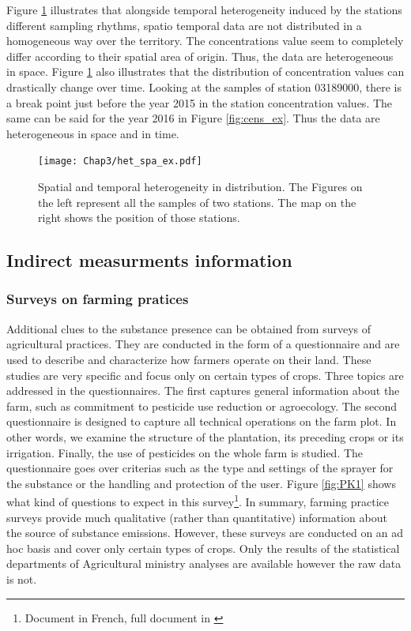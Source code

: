 Figure \ref{fig:het_spa_ex} illustrates that alongside temporal heterogeneity induced by the stations different sampling rhythms, spatio temporal data are not distributed in a homogeneous way over the territory. The concentrations value seem to completely differ according to their spatial area of origin. Thus, the data are heterogeneous in space. Figure \ref{fig:het_spa_ex} also illustrates that the distribution of concentration values can drastically change over time. Looking at the samples of station 03189000, there is a break point just before the year 2015 in the station concentration values. The same can be said for the year 2016 in Figure \ref{fig:cens_ex}. Thus the data are heterogeneous in space and in time.  

\begin{figure}[ht]
    \centering
    \texttt{[image: Chap3/het\_spa\_ex.pdf]}
    \caption{Spatial and temporal heterogeneity in distribution. The Figures on the left represent all the samples of two stations. The map on the right shows the position of those stations.}
    \label{fig:het_spa_ex}
\end{figure}

\subsection{Indirect measurments information}

\subsubsection{Surveys on farming pratices}

Additional clues to the substance presence can be obtained from surveys of agricultural practices. They are conducted in the form of a questionnaire and are used to describe and characterize how farmers operate on their land. These studies are very specific and focus only on certain types of crops. Three topics are addressed in the questionnaires. The first captures general information about the farm, such as commitment to pesticide use reduction or agroecology. The second questionnaire is designed to capture all technical operations on the farm plot. In other words, we examine the structure of the plantation, its preceding crops or its irrigation. Finally, the use of pesticides on the whole farm is studied. The questionnaire goes over criterias such as the type and settings of the sprayer for the substance or the handling and protection of the user.  
Figure \ref{fig:PK1} shows what kind of questions to expect in this survey\footnote{Document in French, full document in \cite{PK}}. In summary, farming practice surveys provide much qualitative (rather than quantitative) information about the source of substance emissions. However, these surveys are conducted on an ad hoc basis and cover only certain types of crops. Only the results of the statistical departments of Agricultural ministry analyses \cite{PK2} are available however the raw data is not. 

